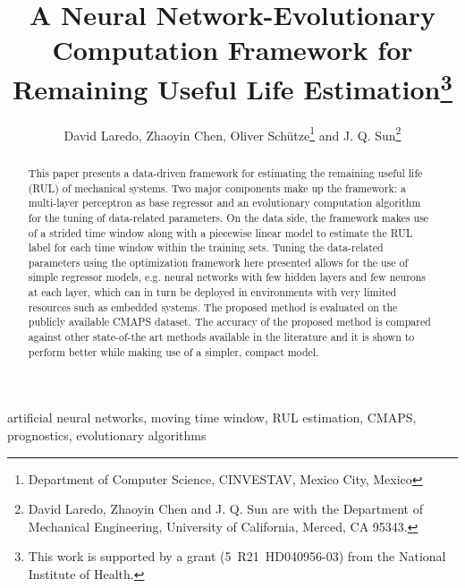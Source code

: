 
\title{A Neural Network-Evolutionary Computation Framework for Remaining Useful Life Estimation\thanks{This work is supported by a grant (5~R21~HD040956-03) from the National Institute of Health.}}

\author{David Laredo, Zhaoyin Chen, Oliver Sch\"utze\thanks{Department of Computer Science, CINVESTAV, Mexico City, Mexico} and J. Q. Sun\thanks{David Laredo, Zhaoyin Chen and J. Q. Sun are with the Department of Mechanical Engineering, University of California, Merced, CA 95343.}}%


\maketitle

\begin{abstract}
This paper presents a data-driven framework for estimating the remaining useful life (RUL) of mechanical systems. Two major components make up the framework: a multi-layer perceptron as base regressor and an evolutionary computation algorithm for the tuning of data-related parameters. On the data side, the framework makes use of a strided time window along with a piecewise linear model to estimate the RUL label for each time window within the training sets. Tuning the data-related parameters using the optimization framework here presented allows for the use of simple regressor models, e.g. neural networks with few hidden layers and few neurons at each layer, which can in turn be deployed in environments with very limited resources such as embedded systems. The proposed method is evaluated on the publicly available CMAPS dataset. The accuracy of the proposed method is compared against other state-of-the art methods available in the literature and it is shown to perform better while making use of a simpler, compact model.
\end{abstract}


\begin{keywords}
artificial neural networks, moving time window, RUL estimation, CMAPS, prognostics, evolutionary algorithms
\end{keywords}

